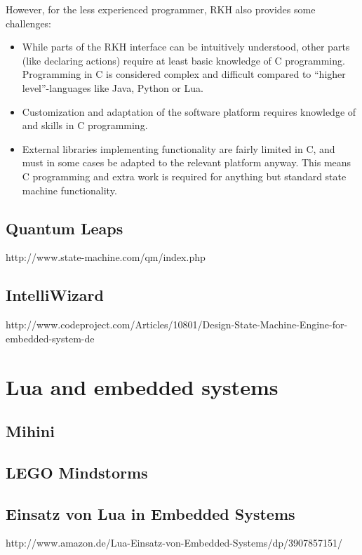 However, for the less experienced programmer, RKH also provides some challenges:
\begin{itemize}
	\item While parts of the RKH interface can be intuitively understood, other parts (like declaring actions) require at least basic knowledge of C programming. Programming in C is considered complex and difficult compared to “higher level”-languages like Java, Python or Lua.
	\item Customization and adaptation of the software platform requires knowledge of and skills in C programming.
	\item External libraries implementing functionality are fairly limited in C, and must in some cases be adapted to the relevant platform anyway. This means C programming and extra work is required for anything but standard state machine functionality.
\end{itemize}

\subsection{Quantum Leaps}
http://www.state-machine.com/qm/index.php

\subsection{IntelliWizard}
http://www.codeproject.com/Articles/10801/Design-State-Machine-Engine-for-embedded-system-de

\section{Lua and embedded systems}

\subsection{Mihini}

\subsection{LEGO Mindstorms}
\cite{chapter:porting_lua_microcontroller}

\subsection{Einsatz von Lua in Embedded Systems}
http://www.amazon.de/Lua-Einsatz-von-Embedded-Systems/dp/3907857151/

